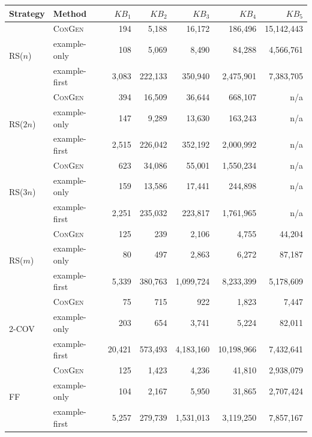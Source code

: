 \begin{tabular}{llrrrrr}
\toprule
Strategy & Method & $KB_1$ & $KB_2$ & $KB_3$ & $KB_4$ & $KB_5$ \\
\midrule
\multirow{3}{*}{RS($n$)} & \textsc{ConGen} & 194 & 5{,}188 & 16{,}172 & 186{,}496 & 15{,}142{,}443 \\
 & example-only & 108 & 5{,}069 & 8{,}490 & 84{,}288 & 4{,}566{,}761 \\
 & example-first & 3{,}083 & 222{,}133 & 350{,}940 & 2{,}475{,}901 & 7{,}383{,}705 \\
\midrule
\multirow{3}{*}{RS($2n$)} & \textsc{ConGen} & 394 & 16{,}509 & 36{,}644 & 668{,}107 & n/a \\
 & example-only & 147 & 9{,}289 & 13{,}630 & 163{,}243 & n/a \\
 & example-first & 2{,}515 & 226{,}042 & 352{,}192 & 2{,}000{,}992 & n/a \\
\midrule
\multirow{3}{*}{RS($3n$)} & \textsc{ConGen} & 623 & 34{,}086 & 55{,}001 & 1{,}550{,}234 & n/a \\
 & example-only & 159 & 13{,}586 & 17{,}441 & 244{,}898 & n/a \\
 & example-first & 2{,}251 & 235{,}032 & 223{,}817 & 1{,}761{,}965 & n/a \\
\midrule
\multirow{3}{*}{RS($m$)} & \textsc{ConGen} & 125 & 239 & 2{,}106 & 4{,}755 & 44{,}204 \\
 & example-only & 80 & 497 & 2{,}863 & 6{,}272 & 87{,}187 \\
 & example-first & 5{,}339 & 380{,}763 & 1{,}099{,}724 & 8{,}233{,}399 & 5{,}178{,}609 \\
\midrule
\multirow{3}{*}{2-COV} & \textsc{ConGen} & 75 & 715 & 922 & 1{,}823 & 7{,}447 \\
 & example-only & 203 & 654 & 3{,}741 & 5{,}224 & 82{,}011 \\
 & example-first & 20{,}421 & 573{,}493 & 4{,}183{,}160 & 10{,}198{,}966 & 7{,}432{,}641 \\
\midrule
\multirow{3}{*}{FF} & \textsc{ConGen} & 125 & 1{,}423 & 4{,}236 & 41{,}810 & 2{,}938{,}079 \\
 & example-only & 104 & 2{,}167 & 5{,}950 & 31{,}865 & 2{,}707{,}424 \\
 & example-first & 5{,}257 & 279{,}739 & 1{,}531{,}013 & 3{,}119{,}250 & 7{,}857{,}167 \\
\bottomrule
\end{tabular}
